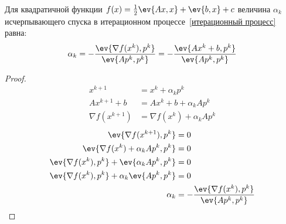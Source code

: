 \begin{theorem}
    Для квадратичной функции \(f(x) = \frac{1}{2} \ev{Ax, x} + \ev{b, x} + c\) величина \(\alpha_k\) исчерпывающего спуска в итерационном процессе~\eqref{итерационный процесс} равна:
    \begin{equation}
        \alpha_k = - \frac{\ev{\nabla f(x^k), p^k}}{\ev{A p^k, p^k}} = - \frac{\ev{Ax^k + b, p^k}}{\ev{Ap^k, p^k}}
        \label{alpha k в исчерпывающем спуске}
    \end{equation}
\end{theorem}
\begin{proof}
    \begin{align*}
        x^{k + 1}           & = x^k + \alpha_k p^k             \\
        Ax^{k + 1} + b      & = Ax^k + b + \alpha_k A p^k      \\
        \nabla f(x^{k + 1}) & = \nabla f(x^k) + \alpha_k A p^k
    \end{align*}
    \begin{align*}
        \ev{\nabla f(x^{k + 1}), p^k}                      & = 0                                                 \\
        \ev{\nabla f(x^k) + \alpha_k A p^k, p^k}           & = 0                                                 \\
        \ev{\nabla f(x^k), p^k} + \ev{\alpha_k A p^k, p^k} & = 0                                                 \\
        \ev{\nabla f(x^k), p^k} + \alpha_k \ev{A p^k, p^k} & = 0                                                 \\
        \alpha_k                                           & = - \frac{\ev{\nabla f(x^k), p^k}}{\ev{A p^k, p^k}}
    \end{align*}
\end{proof}


